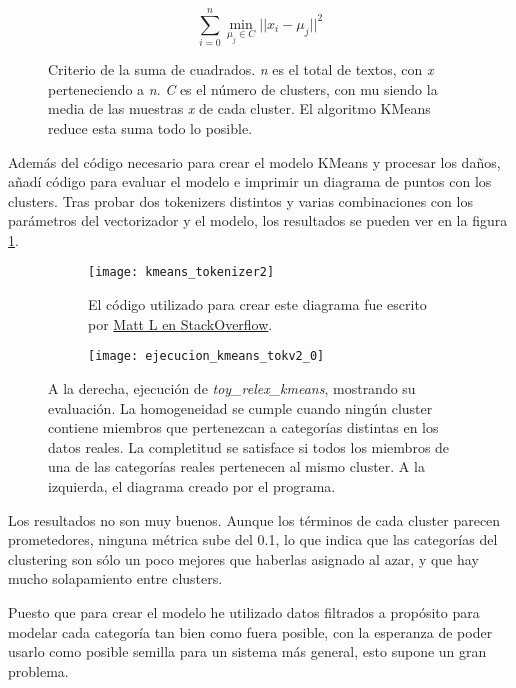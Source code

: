 \documentclass{pre-tfg}
\begin{document}
\begin{figure}[h]
	\begin{equation}
	\sum_{i=0}^{n}\min_{\mu_j \in C}{||x_i - \mu_j ||^2}
	\label{for:ineria}
	\end{equation}
	\caption{Criterio de la suma de cuadrados. \textit{n} es el total de textos, con \textit{x} perteneciendo a \textit{n}. \textit{C} es el número de clusters, con mu siendo la media de las muestras \textit{x} de cada cluster. El algoritmo KMeans reduce esta suma todo lo posible.}
	
\end{figure}

Además del código necesario para crear el modelo KMeans y procesar los daños, añadí código para evaluar el modelo e imprimir un diagrama de puntos con los clusters. Tras probar dos tokenizers distintos y varias combinaciones con los parámetros del vectorizador y el modelo, los resultados se pueden ver en la figura \ref{fig:kmeanresult}.

\begin{figure}[!h]
	\centering
	
	\begin{subfigure}{.4\textwidth}
		\texttt{[image: kmeans\_tokenizer2]}
		\caption{El código utilizado para crear este diagrama fue escrito por \href{https://stackoverflow.com/questions/57626286/how-to-plot-text-clusters}{Matt L en StackOverflow}.}
	\end{subfigure}%
	\begin{subfigure}{.5\textwidth}
		\centering
		\texttt{[image: ejecucion\_kmeans\_tokv2\_0]}
	\end{subfigure}
		
	\caption{A la derecha, ejecución de \textit{toy\_relex\_kmeans}, mostrando su evaluación. La homogeneidad se cumple cuando ningún cluster contiene miembros que pertenezcan a categorías distintas en los datos reales. La completitud se satisface si todos los miembros de una de las categorías reales pertenecen al mismo cluster. A la izquierda, el diagrama creado por el programa.}
	\label{fig:kmeanresult}
\end{figure}

Los resultados no son muy buenos. Aunque los términos de cada cluster parecen prometedores, ninguna métrica sube del 0.1, lo que indica que las categorías del clustering son sólo un poco mejores que haberlas asignado al azar, y que hay mucho solapamiento entre clusters.

Puesto que para crear el modelo he utilizado datos filtrados a propósito para modelar cada categoría tan bien como fuera posible, con la esperanza de poder usarlo como posible semilla para un sistema más general, esto supone un gran problema.
\end{document}
